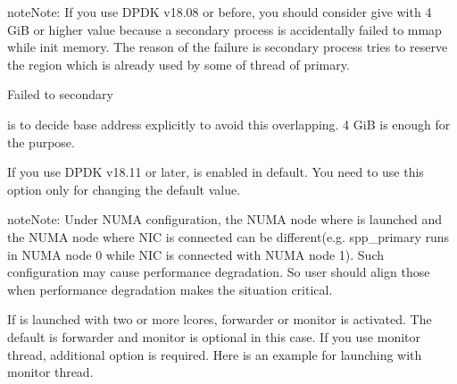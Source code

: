 \documentclass[a4paper,11pt,openany,oneside,english]{sphinxmanual}
\begin{document}
\begin{sphinxadmonition}{note}{Note:}
If you use DPDK v18.08 or before,
you should consider give  with 4 GiB or higher value
because a secondary process is accidentally failed to mmap while init
memory. The reason of the failure is secondary process tries to reserve
the region which is already used by some of thread of primary.

\begin{sphinxVerbatim}[commandchars=\\\{\},formatcom=\footnotesize]
 Failed to secondary
\end{sphinxVerbatim}

 is to decide base address explicitly to avoid this
overlapping. 4 GiB  is enough for the purpose.

If you use DPDK v18.11 or later,  is enabled
in default. You need to use this option only for changing the default value.
\end{sphinxadmonition}

\begin{sphinxadmonition}{note}{Note:}
Under NUMA configuration, the NUMA node where  is launched and
the NUMA node where NIC is connected can be different(e.g. spp\_primary runs in
NUMA node 0 while NIC is connected with NUMA node 1). Such configuration may
cause performance degradation. So user should align those when performance
degradation makes the situation critical.
\end{sphinxadmonition}

If  is launched with two or more lcores, forwarder or monitor
is activated. The default is forwarder and monitor is optional in this case.
If you use monitor thread, additional option  is required.
Here is an example for launching  with monitor thread.
\end{document}
